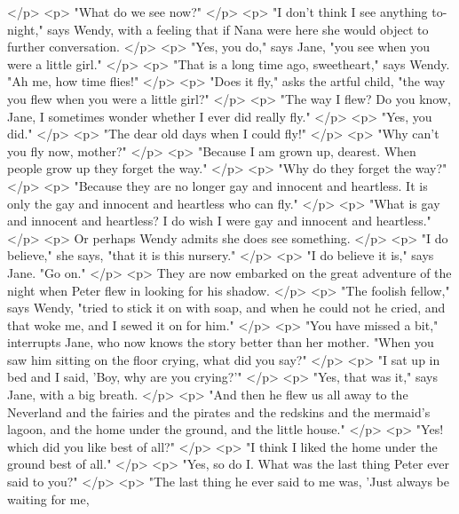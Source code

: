     </p>
    <p>
      "What do we see now?"
    </p>
    <p>
      "I don't think I see anything to-night," says Wendy, with a feeling that
      if Nana were here she would object to further conversation.
    </p>
    <p>
      "Yes, you do," says Jane, "you see when you were a little girl."
    </p>
    <p>
      "That is a long time ago, sweetheart," says Wendy. "Ah me, how time
      flies!"
    </p>
    <p>
      "Does it fly," asks the artful child, "the way you flew when you were a
      little girl?"
    </p>
    <p>
      "The way I flew? Do you know, Jane, I sometimes wonder whether I ever did
      really fly."
    </p>
    <p>
      "Yes, you did."
    </p>
    <p>
      "The dear old days when I could fly!"
    </p>
    <p>
      "Why can't you fly now, mother?"
    </p>
    <p>
      "Because I am grown up, dearest. When people grow up they forget the way."
    </p>
    <p>
      "Why do they forget the way?"
    </p>
    <p>
      "Because they are no longer gay and innocent and heartless. It is only the
      gay and innocent and heartless who can fly."
    </p>
    <p>
      "What is gay and innocent and heartless? I do wish I were gay and innocent
      and heartless."
    </p>
    <p>
      Or perhaps Wendy admits she does see something.
    </p>
    <p>
      "I do believe," she says, "that it is this nursery."
    </p>
    <p>
      "I do believe it is," says Jane. "Go on."
    </p>
    <p>
      They are now embarked on the great adventure of the night when Peter flew
      in looking for his shadow.
    </p>
    <p>
      "The foolish fellow," says Wendy, "tried to stick it on with soap, and
      when he could not he cried, and that woke me, and I sewed it on for him."
    </p>
    <p>
      "You have missed a bit," interrupts Jane, who now knows the story better
      than her mother. "When you saw him sitting on the floor crying, what did
      you say?"
    </p>
    <p>
      "I sat up in bed and I said, 'Boy, why are you crying?'"
    </p>
    <p>
      "Yes, that was it," says Jane, with a big breath.
    </p>
    <p>
      "And then he flew us all away to the Neverland and the fairies and the
      pirates and the redskins and the mermaid's lagoon, and the home under the
      ground, and the little house."
    </p>
    <p>
      "Yes! which did you like best of all?"
    </p>
    <p>
      "I think I liked the home under the ground best of all."
    </p>
    <p>
      "Yes, so do I. What was the last thing Peter ever said to you?"
    </p>
    <p>
      "The last thing he ever said to me was, 'Just always be waiting for me,
